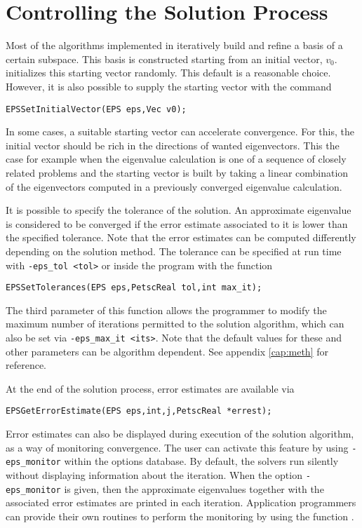 \section{Controlling the Solution Process}

	Most of the algorithms implemented in \slepc iteratively build and refine a basis of a certain subspace. This basis is constructed starting from an initial vector, $v_0$.  initializes this starting vector randomly. This default is a reasonable choice. However, it is also possible to supply the starting vector with the command
	\begin{Verbatim}[fontsize=\small]
	EPSSetInitialVector(EPS eps,Vec v0);
	\end{Verbatim}
In some cases, a suitable starting vector can accelerate convergence. For this, the initial vector should be rich in the directions of wanted eigenvectors. This the case for example when the eigenvalue calculation is one of a sequence of closely related problems and the starting vector is built by taking a linear combination of the eigenvectors computed in a previously converged eigenvalue calculation.

	It is possible to specify the tolerance of the solution. An approximate eigenvalue is considered to be converged if the error estimate associated to it is lower than the specified tolerance. Note that the error estimates can be computed differently depending on the solution method. The tolerance can be specified at run time with \Verb!-eps_tol <tol>! or inside the program with the function
	\begin{Verbatim}[fontsize=\small]
	EPSSetTolerances(EPS eps,PetscReal tol,int max_it);
	\end{Verbatim}
	The third parameter of this function allows the programmer to modify the maximum number of iterations permitted to the solution algorithm, which can also be set via \Verb!-eps_max_it <its>!. Note that the default values for these and other parameters can be algorithm dependent. See appendix \ref{cap:meth} for reference.

	At the end of the solution process, error estimates are available via
	\begin{Verbatim}[fontsize=\small]
	EPSGetErrorEstimate(EPS eps,int,j,PetscReal *errest);
	\end{Verbatim}

	Error estimates can also be displayed during execution of the solution algorithm, as a way of monitoring convergence. The user can activate this feature by using \Verb!-eps_monitor! within the options database. By default, the solvers run silently without displaying information about the iteration. When the option \Verb!-eps_monitor! is given, then the approximate eigenvalues together with the associated error estimates are printed in each iteration. Application programmers can provide their own routines to perform the monitoring by using the function .

